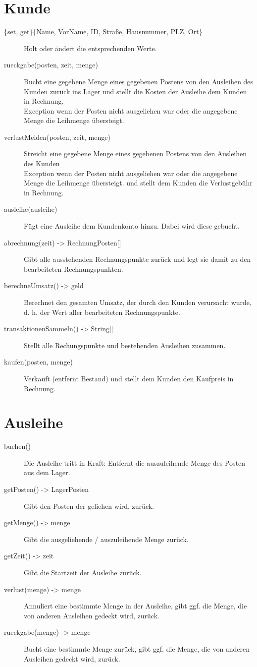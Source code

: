 \documentclass[a4paper,12pt,titlepage]{article}
\begin{document}
\section{Kunde}
\begin{description}
\item[\{set, get\}\{Name, VorName, ID, Straße, Hausnummer, PLZ, Ort\}]
Holt oder ändert die entsprechenden Werte.
\item[rueckgabe(posten, zeit, menge)]
Bucht eine gegebene Menge eines gegebenen Postens von den Ausleihen des Kunden zurück ins Lager
und stellt die Kosten der Ausleihe dem Kunden in Rechnung.\\
Exception wenn der Posten nicht ausgeliehen war oder die angegebene Menge die Leihmenge übersteigt.
\item[verlustMelden(posten, zeit, menge)]
Streicht eine gegebene Menge eines gegebenen Postens von den Ausleihen des Kunden\\
Exception wenn der Posten nicht ausgeliehen war oder die angegebene Menge die Leihmenge übersteigt.
und stellt dem Kunden die Verlustgebühr in Rechnung.
\item[ausleihe(ausleihe)]
Fügt eine Ausleihe dem Kundenkonto hinzu. Dabei wird diese gebucht.
\item[abrechnung(zeit) -> RechnungPosten{[]}]
Gibt alle ausstehenden Rechnungspunkte zurück und legt sie damit zu den bearbeiteten Rechnungspunkten.
\item[berechneUmsatz() -> geld]
Berechnet den gesamten Umsatz, der durch den Kunden verursacht wurde, d. h. der Wert aller bearbeiteten Rechnungspunkte.
\item[transaktionenSammeln() -> String{[]}]
Stellt alle Rechungspunkte und bestehenden Ausleihen zusammen.
\item[kaufen(posten, menge)]
Verkauft (entfernt Bestand) und stellt dem Kunden den Kaufpreis in Rechnung.
\end{description}
\section{Ausleihe}
\begin{description}
\item[buchen()]
Die Ausleihe tritt in Kraft: Entfernt die auszuleihende Menge des Posten aus dem Lager.
\item[getPosten() -> LagerPosten]
Gibt den Posten der geliehen wird, zurück.
\item[getMenge() -> menge]
Gibt die ausgeliehende / auszuleihende Menge zurück.
\item[getZeit() -> zeit]
Gibt die Startzeit der Ausleihe zurück.
\item[verlust(menge) -> menge]
Annuliert eine bestimmte Menge in der Ausleihe, gibt ggf. die Menge, die von anderen Ausleihen gedeckt wird, zurück.
\item[rueckgabe(menge) -> menge]
Bucht eine bestimmte Menge zurück, gibt ggf. die Menge, die von anderen Ausleihen gedeckt wird, zurück.
\end{description}
\end{document}
